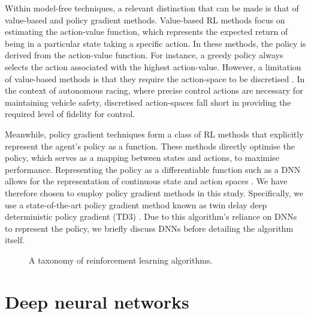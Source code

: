 Within model-free techniques, a relevant distinction that can be made is that of value-based and policy gradient methods.
Value-based RL methods  focus on estimating the action-value function, which represents the expected return of being in a particular state taking a specific action.
In these methods, the policy is derived from the action-value function.
For instance, a greedy policy always selects the action associated with the highest action-value.
However, a limitation of value-based methods is that they require the action-space to be discretised \cite{sutton2020}.
In the context of autonomous racing, where precise control actions are necessary for maintaining vehicle safety, discretised action-spaces fall short in providing the required level of fidelity for control.

Meanwhile, policy gradient techniques form a class of RL methods that explicitly represent the agent's policy as a function.
These methods directly optimise the policy, which serves as a mapping between states and actions, to maximise performance.
Representing the policy as a differentiable function such as a DNN allows for the representation of continuous state and action spaces \cite{silver2014}.
We have therefore chosen to employ policy gradient methods in this study.
Specifically, we use a state-of-the-art policy gradient method known as twin delay deep deterministic policy gradient (TD3) \cite{Fujimoto2018}.
Due to this algorithm's reliance on DNNs to represent the policy, we briefly discuss DNNs before detailing the algorithm itself.


\begin{figure}[htb!]
    \centering
    
    \caption[A taxonomy of reinforcement learning algorithms]{A taxonomy of reinforcement learning algorithms.}
    \label{fig:RL:taxonomy}
\end{figure}











\section{Deep neural networks}\label{sec:dnns}


